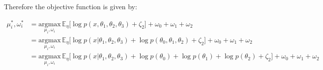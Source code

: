 \documentclass[10pt]{article}
\begin{document}
Therefore the objective function is given by:

\begin{align*}
  \mu_i^*, \omega_i^* &= \underset{\mu_i, \omega_i}{\text{argmax}}\,\mathbb{E}_\eta\big[\log p(x, \theta_1, \theta_2, \theta_3) + \zeta_2 \big] + \omega_0 + \omega_1 + \omega_2 \\
  &= \underset{\mu_i, \omega_i}{\text{argmax}}\,\mathbb{E}_\eta\big[\log p(x | \theta_1, \theta_2, \theta_3) + \log p(\theta_0, \theta_1, \theta_2) + \zeta_2 \big] + \omega_0 + \omega_1 + \omega_2 \\
  &= \underset{\mu_i, \omega_i}{\text{argmax}}\,\mathbb{E}_\eta\big[\log p(x | \theta_1, \theta_2, \theta_3) + \log p(\theta_0) + \log p (\theta_1) + \log p(\theta_2) + \zeta_2 \big] + \omega_0 + \omega_1 + \omega_2
\end{align*}
\end{document}
